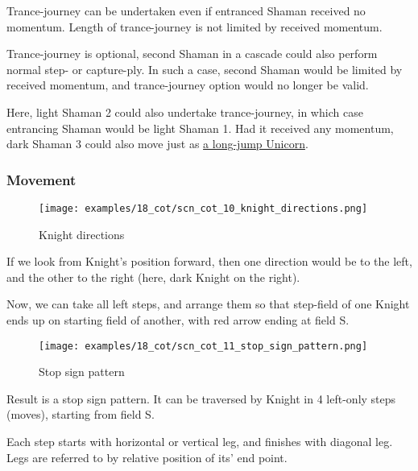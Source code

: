 Trance-journey can be undertaken even if entranced Shaman received no momentum.
Length of trance-journey is not limited by received momentum.

Trance-journey is optional, second Shaman in a cascade could also perform normal
step- or capture-ply. In such a case, second Shaman would be limited by received
momentum, and trance-journey option would no longer be valid.

Here, light Shaman 2 could also undertake trance-journey, in which case entrancing
Shaman would be light Shaman 1.
Had it received any momentum, dark Shaman 3 could also move just as
\hyperref[fig:scn_cot_04_dark_shaman_step_ply]{a long-jump Unicorn}.

\clearpage %

\subsubsection*{Movement}

\noindent
\begin{wrapfigure}[10]{l}{0.4\textwidth}
\centering
\texttt{[image: examples/18\_cot/scn\_cot\_10\_knight\_directions.png]}
\caption{Knight directions}
\label{fig:scn_cot_10_knight_directions}
\end{wrapfigure}
If we look from Knight's position forward, then one direction would be to
the left, and the other to the right (here, dark Knight on the right).

Now, we can take all left steps, and arrange them so that step-field of one
Knight ends up on starting field of another, with red arrow ending at field S.


\vspace*{0.10\textheight}
\noindent
\begin{wrapfigure}[12]{l}{0.4\textwidth}
\centering
\texttt{[image: examples/18\_cot/scn\_cot\_11\_stop\_sign\_pattern.png]}
\caption{Stop sign pattern}
\label{fig:scn_cot_11_stop_sign_pattern}
\end{wrapfigure}
Result is a stop sign pattern. It can be traversed by Knight in 4 left-only
steps (moves), starting from field S.

Each step starts with horizontal or vertical leg, and finishes with diagonal
leg. Legs are referred to by relative position of its' end point.

